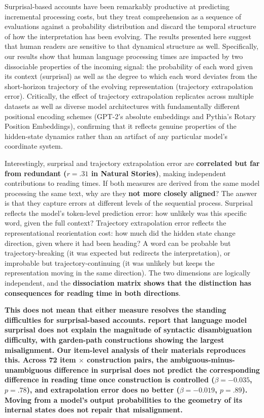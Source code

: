 \documentclass[12pt]{article}
\newcommand{\new}[1]{{\bfseries #1}}
\begin{document}
Surprisal-based accounts have been remarkably productive at predicting incremental processing costs, but they treat comprehension as a sequence of evaluations against a probability distribution and discard the temporal structure of how the interpretation has been evolving. The results presented here suggest that human readers are sensitive to that dynamical structure as well. Specifically, our results show that human language processing times are impacted by two dissociable properties of the incoming signal: the probability of each word given its context (surprisal) as well as the degree to which each word deviates from the short-horizon trajectory of the evolving representation (trajectory extrapolation error). Critically, the effect of trajectory extrapolation replicates across multiple datasets as well as diverse model architectures with fundamentally different positional encoding schemes (GPT-2's absolute embeddings and Pythia's Rotary Position Embeddings), confirming that it reflects genuine properties of the hidden-state dynamics rather than an artifact of any particular model's coordinate system.

Interestingly, surprisal and trajectory extrapolation error are \new{correlated but far from redundant ($r = .31$ in Natural Stories)}, making independent contributions to reading times. If both measures are derived from the same model processing the same text, why are they \new{not more closely aligned}? The answer is that they capture errors at different levels of the sequential process. Surprisal reflects the model's token-level prediction error: how unlikely was this specific word, given the full context? Trajectory extrapolation error reflects the representational reorientation cost: how much did the hidden state change direction, given where it had been heading? A word can be probable but trajectory-breaking (it was expected but redirects the interpretation), or improbable but trajectory-continuing (it was unlikely but keeps the representation moving in the same direction). The two dimensions are logically independent, and the \new{dissociation matrix shows that the distinction has consequences for reading time in both directions}.

\new{This does not mean that either measure resolves the standing difficulties for surprisal-based accounts. \citet{huang2024} report that language model surprisal does not explain the magnitude of syntactic disambiguation difficulty, with garden-path constructions showing the largest misalignment. Our item-level analysis of their materials reproduces this. Across 72 item $\times$ construction pairs, the ambiguous-minus-unambiguous difference in surprisal does not predict the corresponding difference in reading time once construction is controlled ($\beta = -0.035$, $p = .78$), and extrapolation error does no better ($\beta = -0.019$, $p = .89$). Moving from a model's output probabilities to the geometry of its internal states does not repair that misalignment.}
\end{document}
